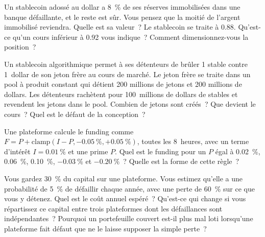 \begin{question}\label{iq:iv2:crypto-for-traders-and-researchers:16}
Un stablecoin adossé au dollar a 8~\% de ses réserves immobilisées dans une banque défaillante, et le reste est sûr. Vous pensez que la moitié de l'argent immobilisé reviendra. Quelle est sa valeur~? Le stablecoin se traite à 0.88. Qu'est-ce qu'un cours inférieur à 0.92 vous indique~? Comment dimensionnez-vous la position~?
\end{question}

\begin{question}\label{iq:iv2:crypto-for-traders-and-researchers:17}
Un stablecoin algorithmique permet à ses détenteurs de brûler 1 stable contre 1~dollar de son jeton frère au cours de marché. Le jeton frère se traite dans un pool à produit constant qui détient 200 millions de jetons et 200 millions de dollars. Les détenteurs rachètent pour 100~millions de dollars de stables et revendent les jetons dans le pool. Combien de jetons sont créés~? Que devient le cours~? Quel est le défaut de la conception~?
\end{question}

\begin{question}\label{iq:iv2:crypto-for-traders-and-researchers:18}
Une plateforme calcule le funding comme $F = P + \mathrm{clamp}(I - P, -0.05~\%, +0.05~\%)$, toutes les 8~heures, avec un terme d'intérêt $I = 0.01~\%$ et une prime $P$. Quel est le funding pour un $P$ égal à 0.02~\%, 0.06~\%, 0.10~\%, $-0.03~\%$ et $-0.20~\%$~? Quelle est la forme de cette règle~?
\end{question}

\begin{question}\label{iq:iv2:crypto-for-traders-and-researchers:19}
Vous gardez 30~\% du capital sur une plateforme. Vous estimez qu'elle a une probabilité de 5~\% de défaillir chaque année, avec une perte de 60~\% sur ce que vous y détenez. Quel est le coût annuel espéré~? Qu'est-ce qui change si vous répartissez ce capital entre trois plateformes dont les défaillances sont indépendantes~? Pourquoi un portefeuille couvert est-il plus mal loti lorsqu'une plateforme fait défaut que ne le laisse supposer la simple perte~?
\end{question}

